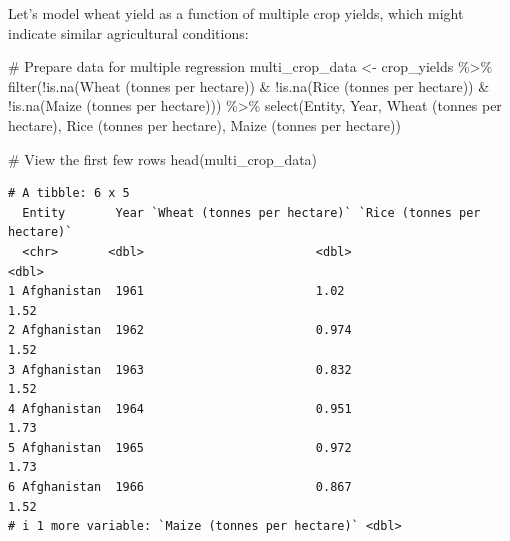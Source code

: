 \documentclass[
  letterpaper,
]{book}
\newenvironment{Shaded}{\begin{snugshade}}{\end{snugshade}}
\newcommand{\AttributeTok}[1]{\textcolor[rgb]{0.40,0.45,0.13}{#1}}
\newcommand{\CommentTok}[1]{\textcolor[rgb]{0.37,0.37,0.37}{#1}}
\newcommand{\FunctionTok}[1]{\textcolor[rgb]{0.28,0.35,0.67}{#1}}
\newcommand{\NormalTok}[1]{\textcolor[rgb]{0.00,0.23,0.31}{#1}}
\newcommand{\OtherTok}[1]{\textcolor[rgb]{0.00,0.23,0.31}{#1}}
\newcommand{\SpecialCharTok}[1]{\textcolor[rgb]{0.37,0.37,0.37}{#1}}
\newcommand{\StringTok}[1]{\textcolor[rgb]{0.13,0.47,0.30}{#1}}
\begin{document}
Let's model wheat yield as a function of multiple crop yields, which
might indicate similar agricultural conditions:

\begin{Shaded}
\begin{Highlighting}[]
\CommentTok{\# Prepare data for multiple regression}
\NormalTok{multi\_crop\_data }\OtherTok{\textless{}{-}}\NormalTok{ crop\_yields }\SpecialCharTok{\%\textgreater{}\%}
  \FunctionTok{filter}\NormalTok{(}\SpecialCharTok{!}\FunctionTok{is.na}\NormalTok{(}\StringTok{\textasciigrave{}}\AttributeTok{Wheat (tonnes per hectare)}\StringTok{\textasciigrave{}}\NormalTok{) }\SpecialCharTok{\&} \SpecialCharTok{!}\FunctionTok{is.na}\NormalTok{(}\StringTok{\textasciigrave{}}\AttributeTok{Rice (tonnes per hectare)}\StringTok{\textasciigrave{}}\NormalTok{) }\SpecialCharTok{\&} \SpecialCharTok{!}\FunctionTok{is.na}\NormalTok{(}\StringTok{\textasciigrave{}}\AttributeTok{Maize (tonnes per hectare)}\StringTok{\textasciigrave{}}\NormalTok{)) }\SpecialCharTok{\%\textgreater{}\%}
  \FunctionTok{select}\NormalTok{(Entity, Year, }\StringTok{\textasciigrave{}}\AttributeTok{Wheat (tonnes per hectare)}\StringTok{\textasciigrave{}}\NormalTok{, }\StringTok{\textasciigrave{}}\AttributeTok{Rice (tonnes per hectare)}\StringTok{\textasciigrave{}}\NormalTok{, }\StringTok{\textasciigrave{}}\AttributeTok{Maize (tonnes per hectare)}\StringTok{\textasciigrave{}}\NormalTok{)}

\CommentTok{\# View the first few rows}
\FunctionTok{head}\NormalTok{(multi\_crop\_data)}
\end{Highlighting}
\end{Shaded}

\begin{verbatim}
# A tibble: 6 x 5
  Entity       Year `Wheat (tonnes per hectare)` `Rice (tonnes per hectare)`
  <chr>       <dbl>                        <dbl>                       <dbl>
1 Afghanistan  1961                        1.02                         1.52
2 Afghanistan  1962                        0.974                        1.52
3 Afghanistan  1963                        0.832                        1.52
4 Afghanistan  1964                        0.951                        1.73
5 Afghanistan  1965                        0.972                        1.73
6 Afghanistan  1966                        0.867                        1.52
# i 1 more variable: `Maize (tonnes per hectare)` <dbl>
\end{verbatim}
\end{document}
